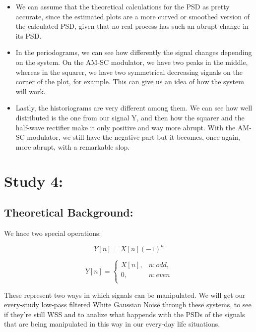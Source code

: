 \documentclass[a4paper,11pt]{article}
\begin{document}
\begin{itemize}

\item We can assume that the theoretical calculations for the PSD as pretty accurate, since the estimated plots are a more curved or smoothed version of the calculated PSD, given that no real process has such an abrupt change in its PSD.

\item In the periodograms, we can see how differently the signal changes depending on the system. On the AM-SC modulator, we have two peaks in the middle, whereas in the squarer, we have two symmetrical decreasing signals on the corner of the plot, for example. This can give us an idea of how the system will work.

\item Lastly, the historiograms are very different among them. We can see how well distributed is the one from our signal Y, and then how the squarer and the half-wave rectifier make it only positive and way more abrupt. With the AM-SC modulator, we still have the negative part but it becomes, once again, more abrupt, with a remarkable slop.

\end{itemize}

\newpage

\section{Study 4:}

\subsection{Theoretical Background:}

We hace two special operations:

\begin{equation}
  Y[n] = X[n](-1)^n
\end{equation}

\begin{equation}
  Y[n] =
    \begin{cases}
        X[n],& n: odd,\\
        0,    & n: even\\
    \end{cases}
\end{equation}

These represent two ways in which signals can be manipulated. We will get our every-study low-pass filtered White Gaussian Noise through these systems, to see if they're still WSS and to analize what happends with the PSDs of the signals that are being manipulated in this way in our every-day life situations.
\end{document}
